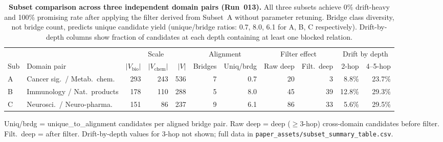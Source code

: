 \begin{table}[h]
\caption{%
  \textbf{Subset comparison across three independent domain pairs (Run~013).}
  All three subsets achieve 0\% drift-heavy and 100\% promising rate after
  applying the filter derived from Subset~A without parameter retuning.
  Bridge class diversity, not bridge count, predicts unique candidate yield
  (unique/bridge ratios: 0.7, 8.0, 6.1 for A, B, C respectively).
  Drift-by-depth columns show fraction of candidates at each depth containing
  at least one blocked relation.
}
\label{tab:subset_comparison}
\small
\begin{tabular}{llrrrrrrrrr}
\toprule
 & & \multicolumn{3}{c}{Scale} & \multicolumn{2}{c}{Alignment} & \multicolumn{2}{c}{Filter effect} & \multicolumn{2}{c}{Drift by depth} \\
\cmidrule(lr){3-5}\cmidrule(lr){6-7}\cmidrule(lr){8-9}\cmidrule(lr){10-11}
Sub & Domain pair &
  $|V_{\text{bio}}|$ & $|V_{\text{chem}}|$ & $|V|$ &
  Bridges & Uniq/brdg &
  Raw deep & Filt.\ deep &
  2-hop & 4--5-hop \\
\midrule
A & Cancer sig.\ / Metab.\ chem. &
  293 & 243 & 536 &
  7 & 0.7 &
  20 & 3 &
  8.8\% & 23.7\% \\
B & Immunology / Nat.\ products &
  178 & 110 & 288 &
  5 & 8.0 &
  45 & 39 &
  12.8\% & 29.3\% \\
C & Neurosci.\ / Neuro-pharma. &
  151 & 86  & 237 &
  9 & 6.1 &
  86 & 33 &
  5.6\% & 29.5\% \\
\bottomrule
\end{tabular}

\smallskip
\noindent Uniq/brdg = unique\_to\_alignment candidates per aligned bridge pair.
Raw deep = deep ($\geq$3-hop) cross-domain candidates before filter.
Filt.\ deep = after filter.
Drift-by-depth values for 3-hop not shown; full data in \texttt{paper\_assets/subset\_summary\_table.csv}.
\end{table}

